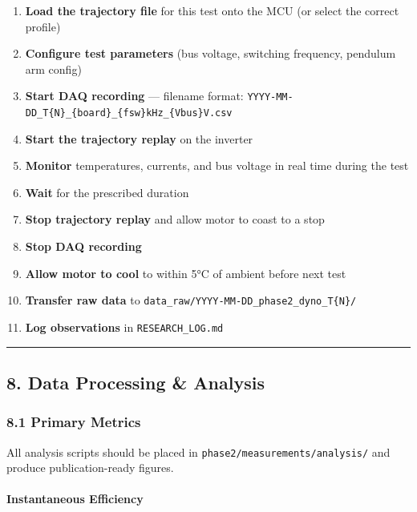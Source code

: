 \documentclass[
]{article}
\providecommand{\tightlist}{%
  \setlength{\itemsep}{0pt}\setlength{\parskip}{0pt}}
\begin{document}
\begin{enumerate}
\def\labelenumi{\arabic{enumi}.}
\tightlist
\item
  \textbf{Load the trajectory file} for this test onto the MCU (or
  select the correct profile)
\item
  \textbf{Configure test parameters} (bus voltage, switching frequency,
  pendulum arm config)
\item
  \textbf{Start DAQ recording} --- filename format:
  \texttt{YYYY-MM-DD\_T\{N\}\_\{board\}\_\{fsw\}kHz\_\{Vbus\}V.csv}
\item
  \textbf{Start the trajectory replay} on the inverter
\item
  \textbf{Monitor} temperatures, currents, and bus voltage in real time
  during the test
\item
  \textbf{Wait} for the prescribed duration
\item
  \textbf{Stop trajectory replay} and allow motor to coast to a stop
\item
  \textbf{Stop DAQ recording}
\item
  \textbf{Allow motor to cool} to within 5°C of ambient before next test
\item
  \textbf{Transfer raw data} to
  \texttt{data\_raw/YYYY-MM-DD\_phase2\_dyno\_T\{N\}/}
\item
  \textbf{Log observations} in \texttt{RESEARCH\_LOG.md}
\end{enumerate}

\begin{center}\rule{0.5\linewidth}{0.5pt}\end{center}

\subsection{8. Data Processing \&
Analysis}\label{data-processing-analysis}

\subsubsection{8.1 Primary Metrics}\label{primary-metrics}

All analysis scripts should be placed in
\texttt{phase2/measurements/analysis/} and produce publication-ready
figures.

\paragraph{Instantaneous Efficiency}\label{instantaneous-efficiency}
\end{document}
